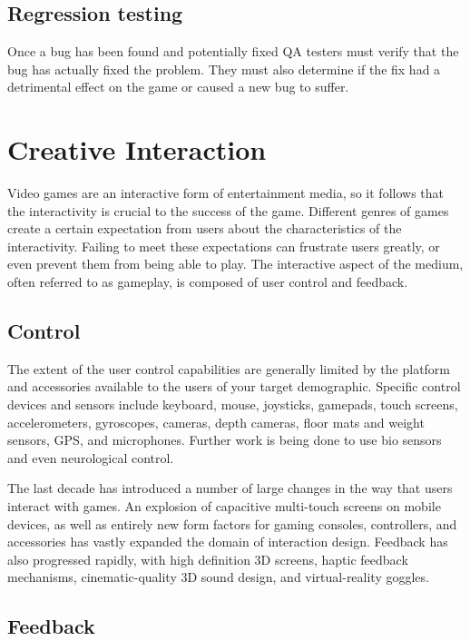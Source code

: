 \subsection{Regression testing} Once a bug has been found and potentially fixed QA testers must verify that the bug has actually fixed the problem. They must also determine if the fix had a detrimental effect on the game or caused a new bug to suffer.

\section{Creative Interaction}

Video games are an interactive form of entertainment media, so it follows that the interactivity is crucial to the success of the game. Different genres of games create a certain expectation from users about the characteristics of the interactivity. Failing to meet these expectations can frustrate users greatly, or even prevent them from being able to play\cite{inter_design_pttrns}. The interactive aspect of the medium, often referred to as gameplay, is composed of user control and feedback. 

\subsection{Control}

The extent of the user control capabilities are generally limited by the platform and accessories available to the users of your target demographic. Specific control devices and sensors include keyboard, mouse, joysticks, gamepads, touch screens, accelerometers, gyroscopes, cameras, depth cameras, floor mats and weight sensors, GPS, and microphones. Further work is being done to use bio sensors and even neurological control. 

The last decade has introduced a number of large changes in the way that users interact with games. An explosion of capacitive multi-touch screens on mobile devices, as well as entirely new form factors for gaming consoles, controllers, and accessories has vastly expanded the domain of interaction design. Feedback has also progressed rapidly, with high definition 3D screens, haptic feedback mechanisms, cinematic-quality 3D sound design, and virtual-reality goggles.

\subsection{Feedback}

